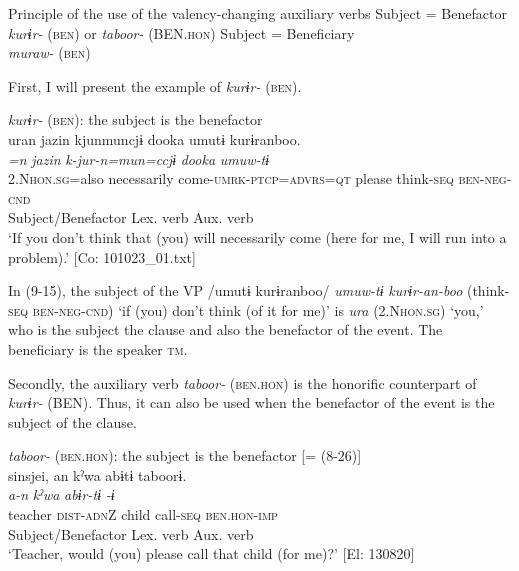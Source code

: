 \ea   Principle of the use of the valency-changing auxiliary verbs \label{ex:9.14}
  \ea Subject = Benefactor\\
    \textit{kurɨr-} (\textsc{ben}) or \textit{taboor-} (BEN.\textsc{hon})
  \ex Subject = Beneficiary\\
    \textit{muraw-} (\textsc{ben})
    \z
\z

    
  First, I will present the example of \textit{kurɨr-} (\textsc{ben}).

\ea   \textit{kurɨr-} (\textsc{ben}): the subject is the benefactor\label{ex:9.15}\\
 \gllll  uran  jazin  kjunmuncjɨ  dooka  umutɨ  kurɨranboo.\\
    \textit{=n}  \textit{jazin}  \textit{k-jur-n=mun=ccjɨ}  \textit{dooka}  \textit{umuw-tɨ}  \textit{}\\
    2.N\textsc{hon}.\textsc{sg}=also  necessarily  come-\textsc{umrk}-\textsc{ptcp}=\textsc{advrs}=\textsc{qt}  please  think-\textsc{seq}  \textsc{ben}-\textsc{neg}-\textsc{cnd}\\
    Subject/Benefactor                                             Lex. verb  Aux. verb\\
    \glt     ‘If you don’t think that (you) will necessarily come (here for me, I will run into a problem).’ [Co: 101023\_01.txt]
\z

In (9-15), the subject of the VP /umutɨ kurɨranboo/ \textit{umuw-tɨ} \textit{kurɨr-an-boo} (think-\textsc{seq} \textsc{ben}-\textsc{neg}-\textsc{cnd}) ‘if (you) don’t think (of it for me)’ is \textit{ura} (2.N\textsc{hon}.\textsc{sg}) ‘you,’ who is the subject the clause and also the benefactor of the event. The beneficiary is the speaker \textsc{tm}.

  Secondly, the auxiliary verb \textit{taboor-} (\textsc{ben}.\textsc{hon}) is the honorific counterpart of \textit{kurɨr-} (BEN). Thus, it can also be used when the benefactor of the event is the subject of the clause.

\ea   \textit{taboor-} (\textsc{ben}.\textsc{hon}): the subject is the benefactor [= (8-26)]\label{ex:9.16}\\
 \gllll  {\textbar}sinsjei{\textbar},  an  kˀwa  abɨtɨ  taboorɨ.\\
    \textit{}  \textit{a-n}  \textit{kˀwa}  \textit{abɨr-tɨ}  \textit{-ɨ}\\
    teacher  \textsc{dist}-\textsc{adn}Z  child  call-\textsc{seq}  \textsc{ben}.\textsc{hon}-\textsc{imp}\\
    Subject/Benefactor      Lex. verb  Aux. verb\\
    \glt     ‘Teacher, would (you) please call that child (for me)?’ [El: 130820]
\z

